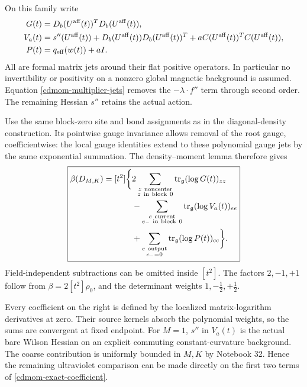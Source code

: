 On this family write
\begin{align}
 G(t)&=D_b(U^{\rm aff}(t))^TD_b(U^{\rm aff}(t)),\notag\\
 V_a(t)&=s''(U^{\rm aff}(t))
           +D_b(U^{\rm aff}(t))D_b(U^{\rm aff}(t))^T
           +aC(U^{\rm aff}(t))^TC(U^{\rm aff}(t)),\notag\\
 P(t)&=q_{\rm eff}(w(t))+aI.
 \label{cdmom-probe-matrices}
\end{align}
All are formal matrix jets around their flat positive
operators. In particular no invertibility or positivity
on a nonzero global magnetic background is assumed.
Equation \eqref{cdmom-multiplier-jets} removes the
\(-\lambda\cdot f''\) term through second order.
The remaining Hessian \(s''\) retains the actual action.

Use the same block-zero site and bond assignments as
in the diagonal-density construction. Its pointwise
gauge invariance allows removal of the root gauge,
coefficientwise: the local gauge identities extend to
these polynomial gauge jets by the same exponential
summation. The density--moment lemma therefore gives
\begin{equation}
 \boxed{\begin{split}
 \beta(D_{M,K})=[t^2]\bigg\{
 &2\sum_{\substack{z\ {\rm noncenter}\\z\ {\rm in\ block}\ 0}}
                   \operatorname{tr}_{\mathfrak g}(\log G(t))_{zz}\\
 &-\sum_{\substack{e\ {\rm current}\\e_-\ {\rm in\ block}\ 0}}
                   \operatorname{tr}_{\mathfrak g}(\log V_a(t))_{ee}\\
 &+\sum_{\substack{c\ {\rm output}\\c_-=0}}
                   \operatorname{tr}_{\mathfrak g}(\log P(t))_{cc}
                      \bigg\}.
 \end{split}}
 \label{cdmom-exact-coefficient}
\end{equation}
Field-independent subtractions can be omitted inside
\([t^2]\). The factors \(2,-1,+1\) follow from
\(\beta=2[t^2]\rho_0\), and the determinant weights
\(1,-\tfrac12,+\tfrac12\).

Every coefficient on the right is defined by the
localized matrix-logarithm derivatives at zero.
Their source kernels absorb the polynomial weights,
so the sums are convergent at fixed endpoint.
For \(M=1\), \(s''\) in \(V_a(t)\) is the actual bare
Wilson Hessian on an explicit commuting constant-curvature
background. The coarse contribution is uniformly bounded
in \(M,K\) by Notebook 32. Hence the remaining ultraviolet
comparison can be made directly on the first two terms
of \eqref{cdmom-exact-coefficient}.

